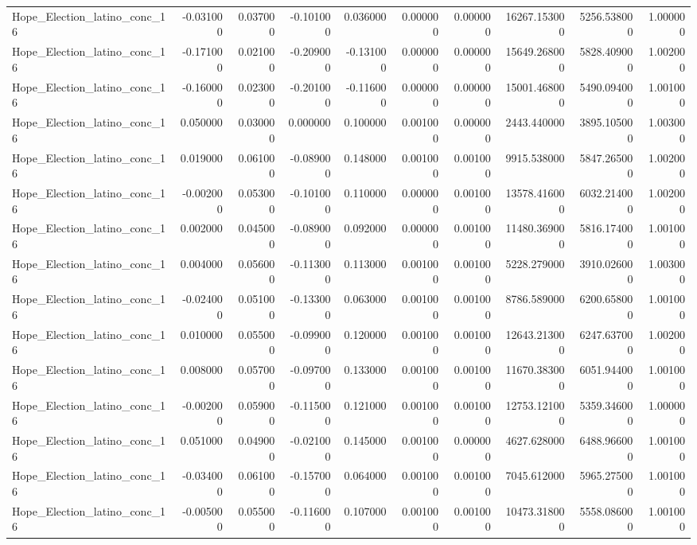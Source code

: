 \begin{table}
\begin{tabular}{lrrrrrrrrr}
Hope_Election_latino_conc_16 & -0.031000 & 0.037000 & -0.101000 & 0.036000 & 0.000000 & 0.000000 & 16267.153000 & 5256.538000 & 1.000000 \\
Hope_Election_latino_conc_16 & -0.171000 & 0.021000 & -0.209000 & -0.131000 & 0.000000 & 0.000000 & 15649.268000 & 5828.409000 & 1.002000 \\
Hope_Election_latino_conc_16 & -0.160000 & 0.023000 & -0.201000 & -0.116000 & 0.000000 & 0.000000 & 15001.468000 & 5490.094000 & 1.001000 \\
Hope_Election_latino_conc_16 & 0.050000 & 0.030000 & 0.000000 & 0.100000 & 0.001000 & 0.000000 & 2443.440000 & 3895.105000 & 1.003000 \\
Hope_Election_latino_conc_16 & 0.019000 & 0.061000 & -0.089000 & 0.148000 & 0.001000 & 0.001000 & 9915.538000 & 5847.265000 & 1.002000 \\
Hope_Election_latino_conc_16 & -0.002000 & 0.053000 & -0.101000 & 0.110000 & 0.000000 & 0.001000 & 13578.416000 & 6032.214000 & 1.002000 \\
Hope_Election_latino_conc_16 & 0.002000 & 0.045000 & -0.089000 & 0.092000 & 0.000000 & 0.001000 & 11480.369000 & 5816.174000 & 1.001000 \\
Hope_Election_latino_conc_16 & 0.004000 & 0.056000 & -0.113000 & 0.113000 & 0.001000 & 0.001000 & 5228.279000 & 3910.026000 & 1.003000 \\
Hope_Election_latino_conc_16 & -0.024000 & 0.051000 & -0.133000 & 0.063000 & 0.001000 & 0.001000 & 8786.589000 & 6200.658000 & 1.001000 \\
Hope_Election_latino_conc_16 & 0.010000 & 0.055000 & -0.099000 & 0.120000 & 0.001000 & 0.001000 & 12643.213000 & 6247.637000 & 1.002000 \\
Hope_Election_latino_conc_16 & 0.008000 & 0.057000 & -0.097000 & 0.133000 & 0.001000 & 0.001000 & 11670.383000 & 6051.944000 & 1.001000 \\
Hope_Election_latino_conc_16 & -0.002000 & 0.059000 & -0.115000 & 0.121000 & 0.001000 & 0.001000 & 12753.121000 & 5359.346000 & 1.000000 \\
Hope_Election_latino_conc_16 & 0.051000 & 0.049000 & -0.021000 & 0.145000 & 0.001000 & 0.000000 & 4627.628000 & 6488.966000 & 1.001000 \\
Hope_Election_latino_conc_16 & -0.034000 & 0.061000 & -0.157000 & 0.064000 & 0.001000 & 0.001000 & 7045.612000 & 5965.275000 & 1.001000 \\
Hope_Election_latino_conc_16 & -0.005000 & 0.055000 & -0.116000 & 0.107000 & 0.001000 & 0.001000 & 10473.318000 & 5558.086000 & 1.001000 \\

\end{tabular}
\end{table}
